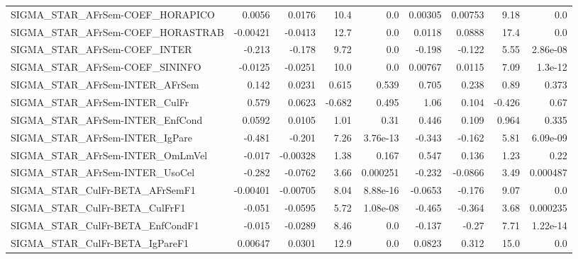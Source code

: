 \begin{tabular}{lrrrrrrrr}
SIGMA\_STAR\_AFrSem-COEF\_HORAPICO       &      0.0056 &       0.0176 &    10.4 &      0.0 &    0.00305 &     0.00753 &         9.18 &           0.0 \\
SIGMA\_STAR\_AFrSem-COEF\_HORASTRAB      &    -0.00421 &      -0.0413 &    12.7 &      0.0 &     0.0118 &      0.0888 &         17.4 &           0.0 \\
SIGMA\_STAR\_AFrSem-COEF\_INTER          &      -0.213 &       -0.178 &    9.72 &      0.0 &     -0.198 &      -0.122 &         5.55 &      2.86e-08 \\
SIGMA\_STAR\_AFrSem-COEF\_SININFO        &     -0.0125 &      -0.0251 &    10.0 &      0.0 &    0.00767 &      0.0115 &         7.09 &       1.3e-12 \\
SIGMA\_STAR\_AFrSem-INTER\_AFrSem        &       0.142 &       0.0231 &   0.615 &    0.539 &      0.705 &       0.238 &         0.89 &         0.373 \\
SIGMA\_STAR\_AFrSem-INTER\_CulFr         &       0.579 &       0.0623 &  -0.682 &    0.495 &       1.06 &       0.104 &       -0.426 &          0.67 \\
SIGMA\_STAR\_AFrSem-INTER\_EnfCond       &      0.0592 &       0.0105 &    1.01 &     0.31 &      0.446 &       0.109 &        0.964 &         0.335 \\
SIGMA\_STAR\_AFrSem-INTER\_IgPare        &      -0.481 &       -0.201 &    7.26 & 3.76e-13 &     -0.343 &      -0.162 &         5.81 &      6.09e-09 \\
SIGMA\_STAR\_AFrSem-INTER\_OmLmVel       &      -0.017 &     -0.00328 &    1.38 &    0.167 &      0.547 &       0.136 &         1.23 &          0.22 \\
SIGMA\_STAR\_AFrSem-INTER\_UsoCel        &      -0.282 &      -0.0762 &    3.66 & 0.000251 &     -0.232 &     -0.0866 &         3.49 &      0.000487 \\
SIGMA\_STAR\_CulFr-BETA\_AFrSemF1        &    -0.00401 &     -0.00705 &    8.04 & 8.88e-16 &    -0.0653 &      -0.176 &         9.07 &           0.0 \\
SIGMA\_STAR\_CulFr-BETA\_CulFrF1         &      -0.051 &      -0.0595 &    5.72 & 1.08e-08 &     -0.465 &      -0.364 &         3.68 &      0.000235 \\
SIGMA\_STAR\_CulFr-BETA\_EnfCondF1       &      -0.015 &      -0.0289 &    8.46 &      0.0 &     -0.137 &       -0.27 &         7.71 &      1.22e-14 \\
SIGMA\_STAR\_CulFr-BETA\_IgPareF1        &     0.00647 &       0.0301 &    12.9 &      0.0 &     0.0823 &       0.312 &         15.0 &           0.0 \\

\end{tabular}
